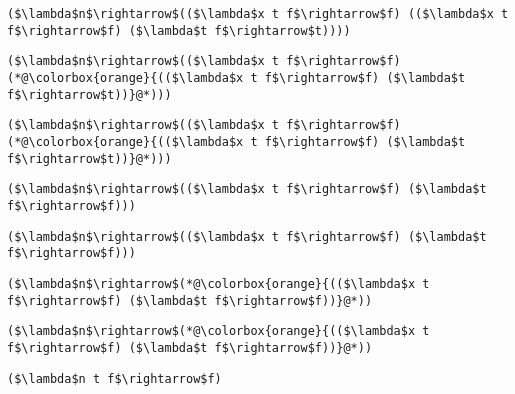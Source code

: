 \documentclass{beamer}
\begin{document}
\begin{frame}[fragile]{\CurrentSection}
\lstset{basicstyle=\ttfamily\small}\lstset{numbers=none}\lstset{language=ML}\begin{lstlisting}
($\lambda$n$\rightarrow$(($\lambda$x t f$\rightarrow$f) (($\lambda$x t f$\rightarrow$f) ($\lambda$t f$\rightarrow$t))))
\end{lstlisting}
\pause\lstset{language=ML}\begin{lstlisting}
($\lambda$n$\rightarrow$(($\lambda$x t f$\rightarrow$f) (*@\colorbox{orange}{(($\lambda$x t f$\rightarrow$f) ($\lambda$t f$\rightarrow$t))}@*)))
\end{lstlisting}

\end{frame}

\begin{frame}[fragile]{\CurrentSection}
\lstset{basicstyle=\ttfamily\small}\lstset{numbers=none}\lstset{language=ML}\begin{lstlisting}
($\lambda$n$\rightarrow$(($\lambda$x t f$\rightarrow$f) (*@\colorbox{orange}{(($\lambda$x t f$\rightarrow$f) ($\lambda$t f$\rightarrow$t))}@*)))
\end{lstlisting}
\pause\lstset{language=ML}\begin{lstlisting}
($\lambda$n$\rightarrow$(($\lambda$x t f$\rightarrow$f) ($\lambda$t f$\rightarrow$f)))
\end{lstlisting}

\end{frame}

\begin{frame}[fragile]{\CurrentSection}
\lstset{basicstyle=\ttfamily\small}\lstset{numbers=none}\lstset{language=ML}\begin{lstlisting}
($\lambda$n$\rightarrow$(($\lambda$x t f$\rightarrow$f) ($\lambda$t f$\rightarrow$f)))
\end{lstlisting}
\pause\lstset{language=ML}\begin{lstlisting}
($\lambda$n$\rightarrow$(*@\colorbox{orange}{(($\lambda$x t f$\rightarrow$f) ($\lambda$t f$\rightarrow$f))}@*))
\end{lstlisting}

\end{frame}

\begin{frame}[fragile]{\CurrentSection}
\lstset{basicstyle=\ttfamily\small}\lstset{numbers=none}\lstset{language=ML}\begin{lstlisting}
($\lambda$n$\rightarrow$(*@\colorbox{orange}{(($\lambda$x t f$\rightarrow$f) ($\lambda$t f$\rightarrow$f))}@*))
\end{lstlisting}
\pause\lstset{language=ML}\begin{lstlisting}
($\lambda$n t f$\rightarrow$f)
\end{lstlisting}

\end{frame}
\end{document}
